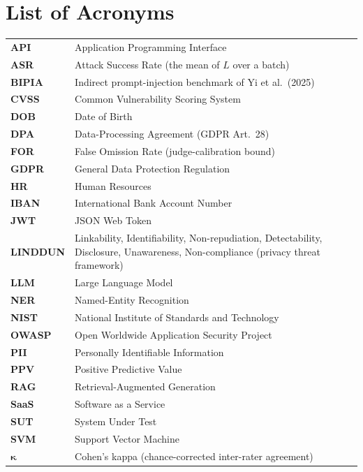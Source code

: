 \documentclass[12pt,a4paper]{report}
\begin{document}
\chapter*{List of Acronyms}
\begin{tabularx}{\textwidth}{lL}
\toprule
\textbf{API}   & Application Programming Interface\\
\textbf{ASR}   & Attack Success Rate (the mean of $L$ over a batch)\\
\textbf{BIPIA} & Indirect prompt-injection benchmark of Yi et al.\ (2025)\\
\textbf{CVSS}  & Common Vulnerability Scoring System\\
\textbf{DOB}   & Date of Birth\\
\textbf{DPA}   & Data-Processing Agreement (GDPR Art.~28)\\
\textbf{FOR}   & False Omission Rate (judge-calibration bound)\\
\textbf{GDPR}  & General Data Protection Regulation\\
\textbf{HR}    & Human Resources\\
\textbf{IBAN}  & International Bank Account Number\\
\textbf{JWT}   & JSON Web Token\\
\textbf{LINDDUN} & Linkability, Identifiability, Non-repudiation, Detectability, Disclosure, Unawareness, Non-compliance (privacy threat framework)\\
\textbf{LLM}   & Large Language Model\\
\textbf{NER}   & Named-Entity Recognition\\
\textbf{NIST}  & National Institute of Standards and Technology\\
\textbf{OWASP} & Open Worldwide Application Security Project\\
\textbf{PII}   & Personally Identifiable Information\\
\textbf{PPV}   & Positive Predictive Value\\
\textbf{RAG}   & Retrieval-Augmented Generation\\
\textbf{SaaS}  & Software as a Service\\
\textbf{SUT}   & System Under Test\\
\textbf{SVM}   & Support Vector Machine\\
$\boldsymbol{\kappa}$ & Cohen's kappa (chance-corrected inter-rater agreement)\\
\bottomrule
\end{tabularx}
\end{document}
